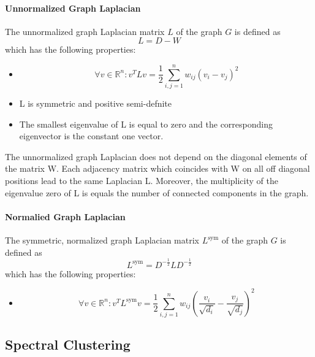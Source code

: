 \paragraph{Unnormalized Graph Laplacian}
The unnormalized graph Laplacian matrix $L$ of the graph $G$ is defined as
\begin{equation}
	L = D - W
\end{equation}
which has the following properties: 
\begin{itemize}
\item \begin{equation}
	\forall v \in \mathbb{R}^n: v^T L v = \frac{1}{2	} \sum_{i,j=1}^n w_{ij} (v_i - v_j)^2
\end{equation}
\item L is symmetric and positive semi-defnite
\item The smallest eigenvalue of L is equal to zero and the corresponding eigenvector is the constant one vector.
\end{itemize}
The unnormalized graph Laplacian does not depend on the diagonal elements of the matrix W. Each adjacency matrix which coincides with W on all off diagonal positions lead to the same Laplacian L. Moreover, the multiplicity of the eigenvalue zero of L is equals the number of connected components in the graph.

%
\paragraph{Normalied Graph Laplacian}
The symmetric, normalized graph Laplacian matrix $L^{\text{sym}}$ of the graph $G$ is defined as
\begin{equation}
	L^{\text{sym}} = D^{-\frac{1}{2}} L D^{-\frac{1}{2}}
\end{equation}
which has the following properties: 
\begin{itemize}
\item \begin{equation}
	\forall v \in \mathbb{R}^n: v^T L^{\text{sym}} v = \frac{1}{2	} \sum_{i,j=1}^n w_{ij} (\frac{v_i}{\sqrt{d_i}} - \frac{v_j}{\sqrt{d_j}})^2
\end{equation}	
\end{itemize}

\subsection{Spectral Clustering}



